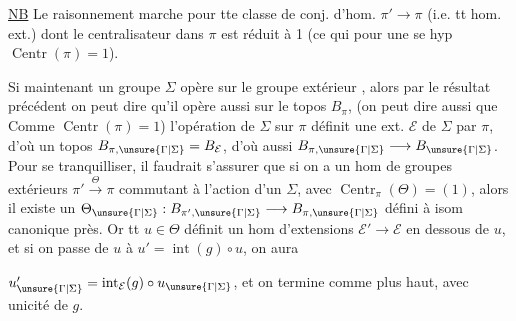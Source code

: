 \uline{NB} Le raisonnement marche pour tte classe
de conj. d'hom.  \(\pi'\longrightarrow\pi\) (i.e. tt hom.
ext.) dont le centralisateur dans \(\pi\) est
réduit à 1 (ce qui pour une  se
hyp \(\operatorname{Centr}(\pi)=1\)).

Si maintenant un groupe \(\Sigma\) opère
sur le groupe extérieur \inserted{\(\pi\)}, alors par le
résultat précédent on peut dire qu'il
opère aussi sur le topos \(B_\pi\),  (on peut
dire aussi que  Comme
\(\operatorname{Centr}(\pi)=1\)) l'opération de \deleted{\(\unsure{\pi}\)}\(\Sigma\) sur \(\pi\)
définit une ext. \(\mathcal E\) de \(\Sigma\) par \(\pi\),
d'où un topos \(B_{\pi,\unsure{\Gamma|\Sigma}}=B_{\mathcal E}\), 
d'où aussi \(B_{\pi,\unsure{\Gamma|\Sigma}}\longrightarrow B_{\unsure{\Gamma|\Sigma}}\). Pour se
tranquilliser, il faudrait s'assurer que
si on a un hom de groupes extérieurs
\(\pi'\xrightarrow{\Theta}\pi\) commutant à l'action d'un
\(\Sigma\), avec \(\operatorname{Centr}_\pi(\Theta)=(1)\), alors il existe
un \(\Theta_{\unsure{\Gamma|\Sigma}}:B_{\pi',\unsure{\Gamma|\Sigma}}\longrightarrow B_{\pi,\unsure{\Gamma|\Sigma}}\) défini à isom
canonique près. Or tt \(u\in\Theta\) définit un
hom d'extensions 
\(\mathcal E'\longrightarrow\mathcal E\) en dessous de
\(u\), et si on passe de \(u\) à \(u'=\operatorname{int}(g)\circ u\), on aura

\(u'_{\unsure{\Gamma|\Sigma}}=\operatorname{int}_{\mathcal E}(g)\circ u_{\unsure{\Gamma|\Sigma}}\), et on termine comme
plus haut, avec unicité de \(g\).

